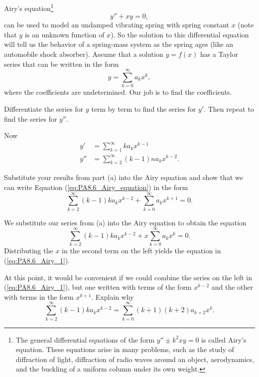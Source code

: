 \begin{exercises}
\item Airy's equation\footnote{The general differential equations of the form $y'' \pm k^2xy = 0$ is called Airy's equation. These equations arise in many problems, such as the study of diffraction of light, diffraction of radio waves around an object, aerodynamics, and the buckling of a uniform column under its own weight.}
\begin{equation} \label{eq:PA8.6_Airy_equation}
y'' + xy = 0,
\end{equation}
can be used to model an undamped vibrating spring with spring constant $x$ (note that $y$ is an unknown function of $x$). So the solution to this differential equation will tell us the behavior of a spring-mass system as the spring ages (like an automobile shock absorber). Assume that a solution $y=f(x)$ has a Taylor series that can be written in the form
\[y = \sum_{k=0}^{\infty} a_kx^k,\]
where the coefficients are undetermined. Our job is to find the coefficients.
    \ba
    \item Differentiate the series for $y$ term by term to find the series for $y'$. Then repeat to find the series for $y''$.

\begin{exerciseSolution}
Now
\begin{align*}
y' &= \sum_{k=1}^{\infty} ka_kx^{k-1} \\
y'' &= \sum_{k=2}^{\infty} (k-1)na_kx^{k-2}.
\end{align*}
\end{exerciseSolution}

    \item Substitute your results from part (a) into the Airy equation and show that we can write Equation (\ref{eq:PA8.6_Airy_equation}) in the form
\begin{equation} \label{eq:PA8.6_Airy_1}
\sum_{k=2}^{\infty} (k-1)ka_kx^{k-2} + \sum_{k=0}^{\infty} a_kx^{k+1} = 0.
\end{equation}

\begin{exerciseSolution}

We substitute our series from (a) into the Airy equation to obtain the equation
\[\sum_{k=2}^{\infty} (k-1)ka_kx^{k-2} + x\sum_{k=0}^{\infty} a_kx^{k} = 0.\]
Distributing the $x$ in the second term on the left yields the equation in (\ref{eq:PA8.6_Airy_1}).

\end{exerciseSolution}

    \item At this point, it would be convenient if we could combine the series on the left in (\ref{eq:PA8.6_Airy_1}), but one written with terms of the form $x^{k-2}$ and the other with terms in the form $x^{k+1}$. Explain why
\begin{equation} \label{eq:PA8.6_Airy_sum_1}
\sum_{k=2}^{\infty} (k-1)ka_kx^{k-2} = \sum_{k=0}^{\infty} (k+1)(k+2)a_{k+2}x^{k}.
\end{equation}


\end{exercises}
